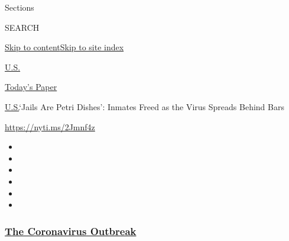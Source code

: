 Sections

SEARCH

\protect\hyperlink{site-content}{Skip to
content}\protect\hyperlink{site-index}{Skip to site index}

\href{https://www.nytimes3xbfgragh.onion/section/us}{U.S.}

\href{https://myaccount.nytimes3xbfgragh.onion/auth/login?response_type=cookie\&client_id=vi}{}

\href{https://www.nytimes3xbfgragh.onion/section/todayspaper}{Today's
Paper}

\href{/section/us}{U.S.}\textbar{}`Jails Are Petri Dishes': Inmates
Freed as the Virus Spreads Behind Bars

\url{https://nyti.ms/2Jmnf4z}

\begin{itemize}
\item
\item
\item
\item
\item
\item
\end{itemize}

\hypertarget{the-coronavirus-outbreak}{%
\subsubsection{\texorpdfstring{\href{https://www.nytimes3xbfgragh.onion/news-event/coronavirus?name=styln-coronavirus-national\&region=TOP_BANNER\&block=storyline_menu_recirc\&action=click\&pgtype=Article\&impression_id=5c0b5320-f4b7-11ea-8240-dbdc704b8894\&variant=undefined}{The
Coronavirus
Outbreak}}{The Coronavirus Outbreak}}\label{the-coronavirus-outbreak}}

